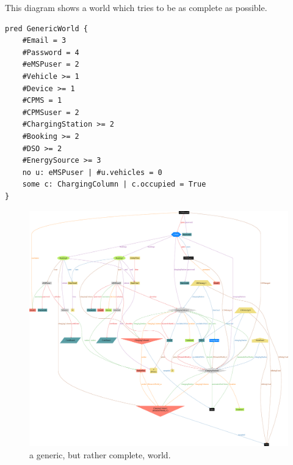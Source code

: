 This diagram shows a world which tries to be as complete as possible.

\begin{verbatim}
pred GenericWorld {
    #Email = 3
    #Password = 4
    #eMSPuser = 2
    #Vehicle >= 1
    #Device >= 1
    #CPMS = 1
    #CPMSuser = 2
    #ChargingStation >= 2
    #Booking >= 2
    #DSO >= 2
    #EnergySource >= 3
    no u: eMSPuser | #u.vehicles = 0
    some c: ChargingColumn | c.occupied = True
}
\end{verbatim}

\begin{figure}[h!]
    \centering
    \includegraphics[width=\columnwidth]{./images/alloy/generic}
    \caption{a generic, but rather complete, world.}
\end{figure}
